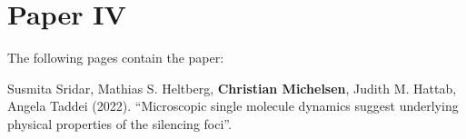 
\chapter{Paper IV}
\label{chapter:diffusion}

The following pages contain the paper:
\vspace*{1cm}


Susmita Sridar, Mathias S. Heltberg, \textbf{Christian Michelsen}, Judith M. Hattab, Angela Taddei (2022). ``Microscopic single molecule dynamics suggest underlying physical properties of the silencing foci''.

% 